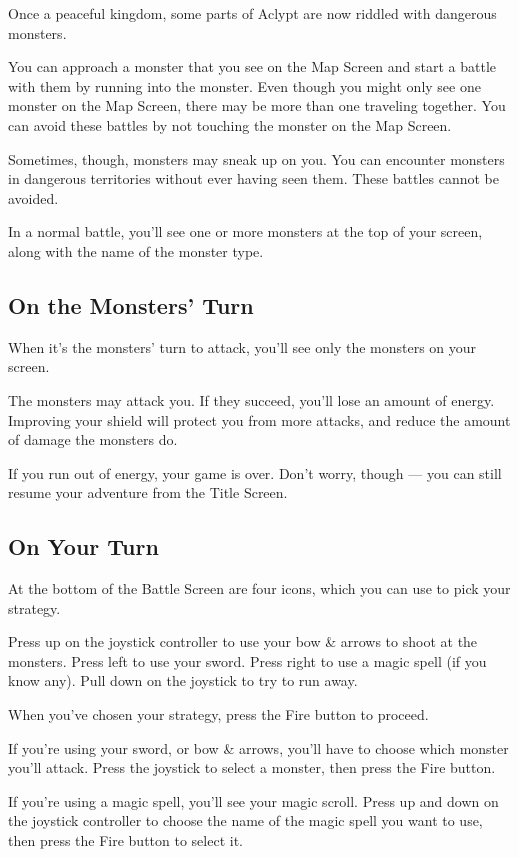 \documentclass[10pt,twoside,openright]{memoir}
\begin{document}
Once a peaceful kingdom, some parts of Aclypt are now riddled with
dangerous monsters.

You can approach a monster that you see on the Map Screen and start a
battle with them by running into the monster. Even though you might
only see one monster on the Map Screen, there may be more than one
traveling together. You can avoid these battles by not touching the
monster on the Map Screen.

Sometimes, though, monsters may sneak up on you. You can encounter
monsters in dangerous territories without ever having seen them. These
battles cannot be avoided.

In a normal battle, you'll see one or more monsters at the top of your
screen, along with the name of the monster type.

\subsection{On the Monsters' Turn}

When it's the monsters' turn to attack, you'll see only the monsters
on your screen.

The monsters may attack you. If they succeed, you'll lose an amount of
energy. Improving your shield will protect you from more attacks, and
reduce the amount of damage the monsters do.

If you run out of energy, your game is over. Don't worry, though ---
you can still resume your adventure from the Title Screen.

\subsection{On Your Turn}

At the bottom of the Battle Screen are four icons, which you can use
to pick your strategy.

Press up on the joystick controller to use your bow \& arrows to shoot
at the monsters. Press left to use your sword. Press right to use a
magic spell (if you know any). Pull down on the joystick to try to run
away.

When you've chosen your strategy, press the Fire button to proceed.

If you're using your sword, or bow \& arrows, you'll have to choose
which monster you'll attack. Press the joystick to select a monster,
then press the Fire button.

If you're using a magic spell, you'll see your magic scroll. Press up
and down on the joystick controller to choose the name of the magic
spell you want to use, then press the Fire button to select it.
\end{document}
